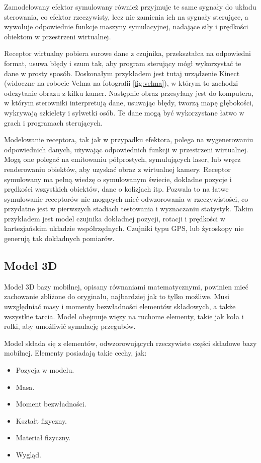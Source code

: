 	Zamodelowany efektor symulowany również przyjmuje te same sygnały do układu sterowania, co efektor rzeczywisty, 
	lecz nie zamienia ich na sygnały sterujące, a wywołuje odpowiednie funkcje maszyny symulacyjnej, nadające siły i prędkości obiektom w przestrzeni wirtualnej.

	Receptor wirtualny pobiera surowe dane z czujnika, przekształca na odpowiedni format, usuwa błędy i szum tak, aby program sterujący mógł wykorzystać te dane w prosty sposób. 
	Doskonałym przykładem jest tutaj urządzenie Kinect (widoczne na robocie Velma na fotografii \ref{fig:velma}), w którym to zachodzi odczytanie obrazu z kilku kamer.
	Następnie obraz przesyłany jest do komputera, w którym sterowniki interpretują dane, usuwając błędy, tworzą mapę głębokości, wykrywają szkielety i sylwetki osób.
	Te dane mogą być wykorzystane łatwo w grach i programach sterujących.

	Modelowanie receptora, tak jak w przypadku efektora, polega na wygenerowaniu odpowiednich danych, używając odpowiednich funkcji w przestrzeni wirtualnej.
	Mogą one polegać na emitowaniu półprostych, symulujących laser, lub wręcz renderowaniu obiektów, aby uzyskać obraz z wirtualnej kamery.
	Receptor symulowany ma pełną wiedzę o symulowanym świecie, dokładne pozycje i prędkości wszystkich obiektów, dane o kolizjach itp. 
	Pozwala to na łatwe symulowanie receptorów nie mogących mieć odwzorowania w rzeczywistości, co przydatne jest w pierwszych stadiach testowania i wyznaczaniu statystyk.
	Takim przykładem jest model czujnika dokładnej pozycji, rotacji i prędkości w kartezjańskim układzie współrzędnych. 
	Czujniki typu GPS, lub żyroskopy nie generują tak dokładnych pomiarów.

	\subsection{Model 3D}
		Model 3D bazy mobilnej, opisany równaniami matematycznymi, powinien mieć zachowanie zbliżone do oryginału, najbardziej jak to tylko możliwe.
		Musi uwzględniać masy i momenty bezwładności elementów składowych, a także wszystkie tarcia.
		Model obejmuje więzy na ruchome elementy, takie jak koła i rolki, aby umożliwić symulację przegubów.

		Model składa się z elementów, odwzorowujących rzeczywiste części składowe bazy mobilnej.
		Elementy posiadają takie cechy, jak:
		\begin{itemize}
			\item Pozycja w modelu.
			\item Masa.
			\item Moment bezwładności.
			\item Kształt fizyczny.
			\item Materiał fizyczny.
			\item Wygląd.
		\end{itemize}

